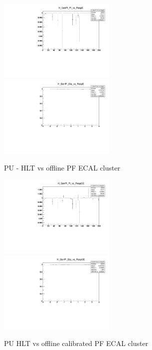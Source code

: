 \begin{figure}
\includegraphics[width=0.495\textwidth]{./plots_pdf/ECAL_plots/Prod6/PU/H_GenPi_Pt_vs_RespE.pdf}
\includegraphics[width=0.495\textwidth]{./plots_pdf/ECAL_plots/Prod6/PU/H_GenPi_Eta_vs_RespE.pdf}
\caption [HLT vs offline PF ECAL cluster for PU senario]{PU - HLT vs offline PF ECAL cluster}
\label{fig:PU_ECAL_Offline_vs_Online_E}
\end{figure}

\begin{figure}
\includegraphics[width=0.495\textwidth]{./plots_pdf/ECAL_plots/Prod6/PU/H_GenPi_Pt_vs_RespCE.pdf}
\includegraphics[width=0.495\textwidth]{./plots_pdf/ECAL_plots/Prod6/PU/H_GenPi_Eta_vs_RespCE.pdf}
\caption[HLT vs offline calibrated PF ECAL cluster for PU senario]{PU HLT vs offline calibrated PF ECAL cluster}
\label{fig:PU_ECAL_Offline_vs_Online_CE}
\end{figure}       
